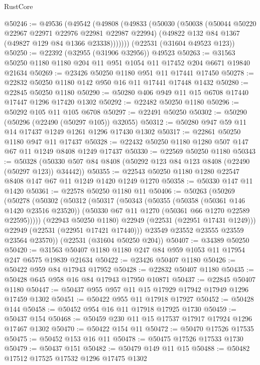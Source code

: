 \begin{lexlean}{RustCore}
\begin{coremodule}
@50246 := @49536
    (@49542
      (@49808
        (@49833
          (@50030
            (@50038
              (@50044 @50220 @22967 @22971 @22976 @22981 @22987 @22994)
              (@49822 @132 @84 @1367 (@49827 @129 @84 @1366 @23338)))))))
    (@22531 (@31604 @49523 @123))
@50250 := @22392 (@32955 (@31906 @32956)) @49523
@50263 := @31563 @50250 @1180 @1180 @204 @11 @951 @1054 @11 @17452 @204 @6671 @19840 @21634
@50269 := @23426 @50250 @1180 @951 @11 @17441 @17450
@50278 := @22832 @50250 @1180 @142 @950 @16 @11 @17441 @17448 @1432
@50280 := @22845 @50250 @1180
@50290 := @50280 @406 @949 @11 @15 @6708 @17440 @17447 @1296 @17420 @1302
@50292 := @22482 @50250 @1180
@50296 := @50292 @105 @11 @105 @6708
@50297 := @22491 @50250
@50302 := @50290 (@50296 (@22490 (@50297 @105)) @32055)
@50312 := @50280 @947 @59 @11 @14 @17437 @1249 @1261 @1296 @17430 @1302
@50317 := @22861 @50250 @1180 @947 @11 @17437
@50328 := @22432 @50250 @1180 @1280 @507 @147 @67 @11 @1249 @8408 @1249 @17437
@50330 := @22569 @50250 @1180
@50343 := @50328 (@50330 @507 @84 @8408 (@50292 @123 @84 @123 @8408 (@22490 (@50297 @123)) @34442))
@50355 := @22543 @50250 @1180 @1280 @22547 @8408 @147 @67 @11 @1249 @1420 @1249 @1270
@50358 := @50330 @147 @11 @1420
@50361 := @22578 @50250 @1180 @11
@50406 := @50263
    (@50269
      (@50278
        (@50302
          (@50312
            (@50317
              (@50343
                (@50355
                  (@50358 (@50361 @146 @1420 @23516 @23520))
                  (@50330 @67 @11 @1270 (@50361 @66 @1270 @22589 @22595)))))
            (@22943 @50250 @1180)
            @22949
            (@22531 (@22951 @17431 @1249)))
          @22949
          (@22531 (@22951 @17421 @17440)))
        @23549
        @23552
        @23555
        @23559
        @23564
        @23570))
    (@22531 (@31604 @50250 @204))
@50407 := @34389 @50250
@50420 := @31563 @50407 @1180 @1180 @247 @84 @959 @1053 @11 @17954 @247 @6575 @19839 @21634
@50422 := @23426 @50407 @1180
@50426 := @50422 @959 @84 @17943 @17952
@50428 := @22832 @50407 @1180
@50435 := @50428 @645 @958 @16 @84 @17943 @17950 @10871
@50437 := @22845 @50407 @1180
@50447 := @50437 @955 @957 @11 @15 @17929 @17942 @17949 @1296 @17459 @1302
@50451 := @50422 @955 @11 @17918 @17927
@50452 := @50428 @144
@50458 := @50452 @954 @16 @11 @17918 @17925 @1730
@50459 := @50437 @154
@50468 := @50459 @230 @11 @15 @17537 @17917 @17924 @1296 @17467 @1302
@50470 := @50422 @154 @11
@50472 := @50470 @17526 @17535
@50475 := @50452 @153 @16 @11
@50478 := @50475 @17526 @17533 @1730
@50479 := @50437 @151
@50482 := @50479 @149 @11 @15
@50488 := @50482 @17512 @17525 @17532 @1296 @17475 @1302

\end{coremodule}
\end{lexlean}
